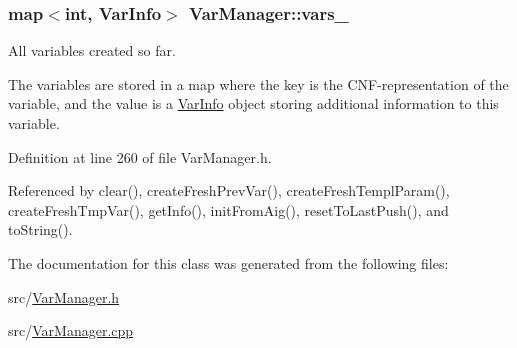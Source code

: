 \hypertarget{classVarManager_a22299c4735b0191e0f81048882692a45}{
\subsubsection[{vars\-\_\-}]{\setlength{\rightskip}{0pt plus 5cm}map$<$int, {\bf Var\-Info}$>$ Var\-Manager\-::vars\-\_\-\hspace{0.3cm}{\ttfamily [protected]}}}\label{classVarManager_a22299c4735b0191e0f81048882692a45}


All variables created so far. 

The variables are stored in a map where the key is the C\-N\-F-\/representation of the variable, and the value is a \hyperlink{classVarInfo}{Var\-Info} object storing additional information to this variable. 

Definition at line 260 of file Var\-Manager.\-h.



Referenced by clear(), create\-Fresh\-Prev\-Var(), create\-Fresh\-Templ\-Param(), create\-Fresh\-Tmp\-Var(), get\-Info(), init\-From\-Aig(), reset\-To\-Last\-Push(), and to\-String().



The documentation for this class was generated from the following files\-:\begin{DoxyCompactItemize}
\item 
src/\hyperlink{VarManager_8h}{Var\-Manager.\-h}\item 
src/\hyperlink{VarManager_8cpp}{Var\-Manager.\-cpp}\end{DoxyCompactItemize}
